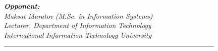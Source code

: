         \begin{figure}[ht]
            \begin{minipage}[t]{0.7\linewidth}{\em \small
                {\bf Opponent: }\\
                Maksat Maratov (M.Sc. in Information Systems)\\
                Lecturer, Department of Information Technology\\
                International Information Technology University
                \vspace{14pt}
                
                \rule{13em}{0.4pt}\\
                }
            \end{minipage}
        \end{figure}